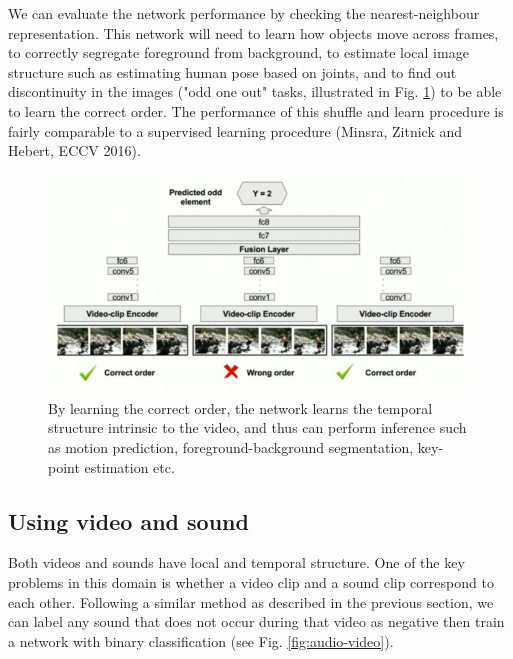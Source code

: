 We can evaluate the network performance by checking the nearest-neighbour representation.
This network will need to learn how objects move across frames, to correctly segregate foreground from background, to estimate local image structure such as estimating human pose based on joints, and to find out discontinuity in the images ("odd one out" tasks, illustrated in Fig. \ref{fig:odd-one}) to be able to learn the correct order.
The performance of this shuffle and learn procedure is fairly comparable to a supervised learning procedure (Minsra, Zitnick and Hebert, ECCV 2016). 
\begin{figure}[H]
  \includegraphics[width=\linewidth]{lectures/13-a/odd-one-out-network.png}
    \caption{By learning the correct order, the network learns the temporal structure intrinsic to the video, and thus can perform inference such as motion prediction, foreground-background segmentation, key-point estimation etc.}
  \label{fig:odd-one}
\end{figure}


\subsection{Using video and sound}

Both videos and sounds have local and temporal structure. One of the key problems in this domain is whether a video clip and a sound clip correspond to each other. 
Following a similar method as described in the previous section, we can label any sound that does not occur during that video as negative then train a network with binary classification (see Fig. \ref{fig:audio-video}). 


